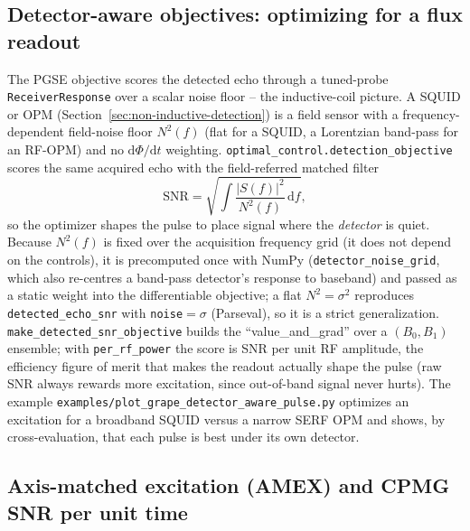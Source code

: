 \documentclass[11pt,oneside]{report}
\newcommand{\code}[1]{\texttt{#1}}
\begin{document}
\subsection{Detector-aware objectives: optimizing for a flux readout}
\label{sec:grape-detector-aware}

The PGSE objective scores the detected echo through a tuned-probe
\code{ReceiverResponse} over a scalar noise floor -- the inductive-coil picture.
A SQUID or OPM (Section~\ref{sec:non-inductive-detection}) is a field sensor with
a frequency-dependent field-noise floor \(N^2(f)\) (flat for a SQUID, a Lorentzian
band-pass for an RF-OPM) and no \(\mathrm{d}\Phi/\mathrm{d}t\) weighting.
\code{optimal\_control.detection\_objective} scores the same acquired echo with
the field-referred matched filter
\[
  \mathrm{SNR} = \sqrt{\int \frac{\lvert S(f)\rvert^2}{N^2(f)}\,\mathrm{d}f},
\]
so the optimizer shapes the pulse to place signal where the \emph{detector} is
quiet. Because \(N^2(f)\) is fixed over the acquisition frequency grid (it does
not depend on the controls), it is precomputed once with NumPy
(\code{detector\_noise\_grid}, which also re-centres a band-pass detector's
response to baseband) and passed as a static weight into the differentiable
objective; a flat \(N^2=\sigma^2\) reproduces \code{detected\_echo\_snr} with
\code{noise}\({}=\sigma\) (Parseval), so it is a strict generalization.
\code{make\_detected\_snr\_objective} builds the ``value\_and\_grad'' over a
\((B_0,B_1)\) ensemble; with \code{per\_rf\_power} the score is SNR per unit RF
amplitude, the efficiency figure of merit that makes the readout actually shape
the pulse (raw SNR always rewards more excitation, since out-of-band signal never
hurts). The example \code{examples/plot\_grape\_detector\_aware\_pulse.py}
optimizes an excitation for a broadband SQUID versus a narrow SERF OPM and shows,
by cross-evaluation, that each pulse is best under its own detector.

\subsection{Axis-matched excitation (AMEX) and CPMG SNR per unit time}
\end{document}
